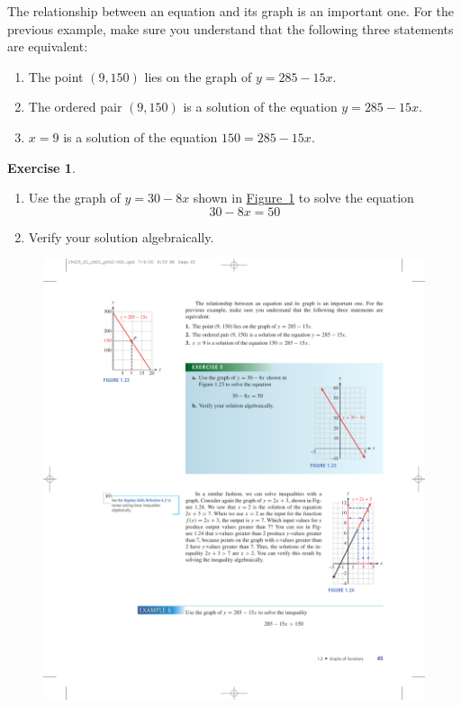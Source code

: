 \documentclass[10pt,]{book}
\theoremstyle{plain}
\theoremstyle{definition}
\theoremstyle{definition}
\theoremstyle{definition}
\theoremstyle{definition}
\newtheorem{exercise}[theorem]{Exercise}
\numberwithin{equation}{part}
\begin{document}
The relationship between an equation and its graph is an important one. For the previous example, make sure you understand that the following three statements are equivalent:%
\leavevmode%
\begin{enumerate}
\item\hypertarget{li-625}{}The point \((9, 150)\) lies on the graph of \(y = 285 - 15x\).%
\item\hypertarget{li-626}{}The ordered pair \((9, 150)\) is a solution of the equation \(y = 285 - 15x\).%
\item\hypertarget{li-627}{}\(x = 9\) is a solution of the equation \(150 = 285 - 15x\).%
\end{enumerate}
\begin{exercise}\label{exercise-graph-to-solve}
\leavevmode%
\begin{enumerate}[label=*\alph**]
\item\hypertarget{li-628}{}Use the graph of \(y = 30 - 8x\) shown in \hyperref[fig-graph-to-solve2]{Figure~\ref{fig-graph-to-solve2}} to solve the equation%
\begin{equation*}
30 - 8x = 50
\end{equation*}
%
\item\hypertarget{li-629}{}Verify your solution algebraically.%
\end{enumerate}
\begin{figure}
\centering
\includegraphics[width=0.5\linewidth]{images/fig-graph-to-solve2}
\caption{\label{fig-graph-to-solve2}}
\end{figure}
\end{exercise}
\end{document}
